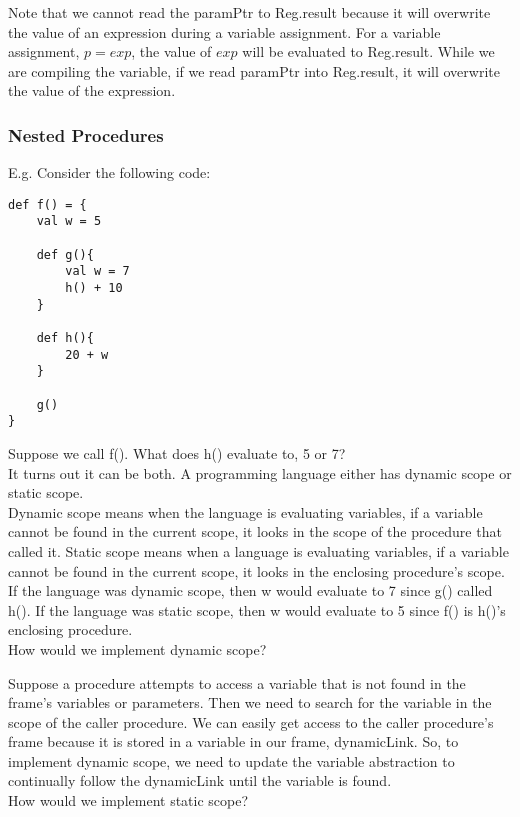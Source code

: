 \documentclass[12pt, letterpaper]{article}
\begin{document}
Note that we cannot read the paramPtr to Reg.result because it will overwrite the value of an expression during a variable assignment. For a variable assignment, \(p = exp\), the value of \(exp\) will be evaluated to Reg.result. While we are compiling the variable, if we read paramPtr into Reg.result, it will overwrite the value of the expression.

\subsubsection{Nested Procedures}
E.g. Consider the following code:
\begin{lstlisting}
def f() = {
	val w = 5
	
	def g(){
		val w = 7
		h() + 10		
	}
	
	def h(){
		20 + w
	}
	
	g()
}
\end{lstlisting}

Suppose we call f(). What does h() evaluate to, 5 or 7?\\

It turns out it can be both. A programming language either has dynamic scope or static scope.\\

Dynamic scope means when the language is evaluating variables, if a variable cannot be found in the current scope, it looks in the scope of the procedure that called it. Static scope means when a language is evaluating variables, if a variable cannot be found in the current scope, it looks in the enclosing procedure's scope.\\

If the language was dynamic scope, then w would evaluate to 7 since g() called h(). If the language was static scope, then w would evaluate to 5 since f() is h()'s enclosing procedure.\\

How would we implement dynamic scope? 

Suppose a procedure attempts to access a variable that is not found in the frame's variables or parameters. Then we need to search for the variable in the scope of the caller procedure. We can easily get access to the caller procedure's frame because it is stored in a variable in our frame, dynamicLink. So, to implement dynamic scope, we need to update the variable abstraction to continually follow the dynamicLink until the variable is found.\\

How would we implement static scope?
\end{document}
